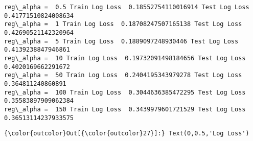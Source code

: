 \documentclass[11pt]{article}
\begin{document}
    \begin{Verbatim}[commandchars=\\\{\}]
reg\_alpha =  0.5 Train Log Loss  0.18552754110016914 Test Log Loss  0.41771510824008634
reg\_alpha =  1 Train Log Loss  0.18708247507165138 Test Log Loss  0.42690521142320964
reg\_alpha =  5 Train Log Loss  0.1889097248930446 Test Log Loss  0.4139238847946861
reg\_alpha =  10 Train Log Loss  0.19732091498184656 Test Log Loss  0.4020169662291672
reg\_alpha =  50 Train Log Loss  0.2404195343979278 Test Log Loss  0.364811240860891
reg\_alpha =  100 Train Log Loss  0.3044636385472295 Test Log Loss  0.35583897909062384
reg\_alpha =  150 Train Log Loss  0.3439979601721529 Test Log Loss  0.36513114237933575

    \end{Verbatim}

\begin{Verbatim}[commandchars=\\\{\}]
{\color{outcolor}Out[{\color{outcolor}27}]:} Text(0,0.5,'Log Loss')
\end{Verbatim}
            
    \begin{center}
    \end{center}
    { \hspace*{\fill} \\}
    
\end{document}
